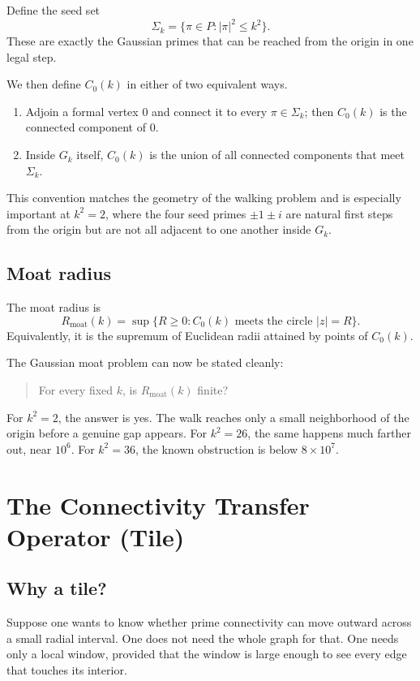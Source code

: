 \documentclass[12pt,letterpaper]{article}
\theoremstyle{definition}
\theoremstyle{remark}
\newcommand{\Rmoat}{R_{\mathrm{moat}}}
\newcommand{\Sigmak}{\Sigma_k}
\newcommand{\Gk}{G_k}
\newcommand{\Pk}{P}
\begin{document}
Define the seed set
\[
\Sigmak=\{\pi\in \Pk:|\pi|^2\le k^2\}.
\]
These are exactly the Gaussian primes that can be reached from the origin in one legal step.

We then define $C_0(k)$ in either of two equivalent ways.

\begin{enumerate}
\item Adjoin a formal vertex $0$ and connect it to every $\pi\in\Sigmak$; then $C_0(k)$ is the connected component of $0$.
\item Inside $\Gk$ itself, $C_0(k)$ is the union of all connected components that meet $\Sigmak$.
\end{enumerate}

This convention matches the geometry of the walking problem and is especially important at $k^2=2$, where the four seed primes $\pm1\pm i$ are natural first steps from the origin but are not all adjacent to one another inside $\Gk$.

\subsection{Moat radius}

The moat radius is
\[
\Rmoat(k)
=
\sup\{R\ge 0 : C_0(k)\text{ meets the circle }|z|=R\}.
\]
Equivalently, it is the supremum of Euclidean radii attained by points of $C_0(k)$.

The Gaussian moat problem can now be stated cleanly:

\begin{quote}
For every fixed $k$, is $\Rmoat(k)$ finite?
\end{quote}

For $k^2=2$, the answer is yes. The walk reaches only a small neighborhood of the origin before a genuine gap appears. For $k^2=26$, the same happens much farther out, near $10^6$. For $k^2=36$, the known obstruction is below $8\times10^7$.

\section{The Connectivity Transfer Operator (Tile)}

\subsection{Why a tile?}

Suppose one wants to know whether prime connectivity can move outward across a small radial interval. One does not need the whole graph for that. One needs only a local window, provided that the window is large enough to see every edge that touches its interior.
\end{document}
